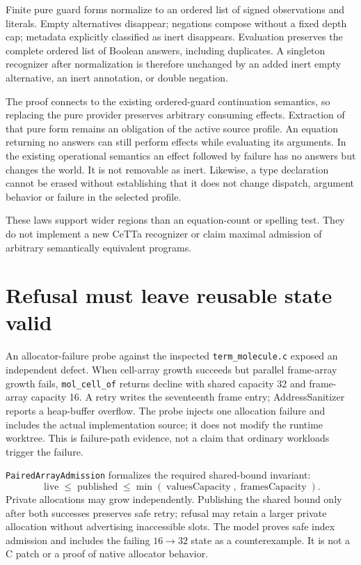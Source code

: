 \documentclass[11pt,a4paper]{article}
\newcommand{\code}[1]{\nolinkurl{#1}}
\begin{document}
Finite pure guard forms normalize to an ordered list of signed observations
and literals. Empty alternatives disappear; negations compose without a fixed
depth cap; metadata explicitly classified as inert disappears. Evaluation
preserves the complete ordered list of Boolean answers, including duplicates.
A singleton recognizer after normalization is therefore unchanged by an added
inert empty alternative, an inert annotation, or double negation.

The proof connects to the existing ordered-guard continuation semantics, so
replacing the pure provider preserves arbitrary consuming effects. Extraction
of that pure form remains an obligation of the active source profile.
An equation returning no answers can still perform effects while evaluating
its arguments. In the existing operational semantics an effect followed by
failure has no answers but changes the world. It is not removable as inert.
Likewise, a type declaration cannot be erased without establishing that it
does not change dispatch, argument behavior or failure in the selected profile.

These laws support wider regions than an equation-count or spelling test.
They do not implement a new CeTTa recognizer or claim maximal admission of
arbitrary semantically equivalent programs.

\section{Refusal must leave reusable state valid}

An allocator-failure probe against the inspected \code{term_molecule.c}
exposed an independent defect. When cell-array growth succeeds but parallel
frame-array growth fails, \code{mol_cell_of} returns decline with shared
capacity 32 and frame-array capacity 16. A retry writes the seventeenth frame
entry; AddressSanitizer reports a heap-buffer overflow. The probe injects one
allocation failure and includes the actual implementation source; it does not
modify the runtime worktree. This is failure-path evidence, not a claim that
ordinary workloads trigger the failure.

\code{PairedArrayAdmission} formalizes the required shared-bound invariant:
\[
 \operatorname{live}\le\operatorname{published}
 \le\min(\operatorname{valuesCapacity},\operatorname{framesCapacity}).
\]
Private allocations may grow independently. Publishing the shared bound only
after both successes preserves safe retry; refusal may retain a larger private
allocation without advertising inaccessible slots. The model proves safe
index admission and includes the failing $16\to32$ state as a counterexample.
It is not a C patch or a proof of native allocator behavior.
\end{document}
